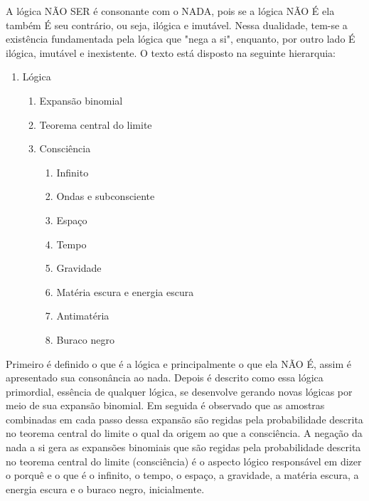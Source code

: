 A lógica NÃO SER é consonante com o NADA, pois se a lógica NÃO É ela também É seu contrário, ou seja, ilógica e imutável. Nessa dualidade, tem-se a existência fundamentada pela lógica que "nega a si", enquanto, por outro lado É ilógica, imutável e inexistente. O texto está disposto na seguinte hierarquia:
{\small
\begin{enumerate}[label*=\arabic*.]
   \item Lógica
   \begin{enumerate}[label*=\arabic*.]
	   \item Expansão binomial
	   \item Teorema central do limite
	   \item Consciência
		   \begin{enumerate}[label*=\arabic*.]
			   \item Infinito
			   \item Ondas e subconsciente
			   \item Espaço
			   \item Tempo
			   \item Gravidade
			   \item Matéria escura e energia escura
			   \item Antimatéria
			   \item Buraco negro
		   \end{enumerate}   
   \end{enumerate}
\end{enumerate}
}
Primeiro é definido o que é a lógica e principalmente o que ela NÃO É, assim é apresentado sua consonância ao nada. Depois é descrito como essa lógica primordial, essência de qualquer lógica, se desenvolve gerando novas lógicas por meio de sua expansão binomial. Em seguida é observado que as amostras combinadas em cada passo dessa expansão são regidas pela probabilidade descrita no teorema central do limite o qual da origem ao que a consciência. A negação da nada a si gera as expansões binomiais que são regidas pela probabilidade descrita no teorema central do limite (consciência) é o aspecto lógico responsável em dizer o porquê e o que é o infinito, o tempo, o espaço, a gravidade, a matéria escura, a energia escura e o buraco negro, inicialmente. 